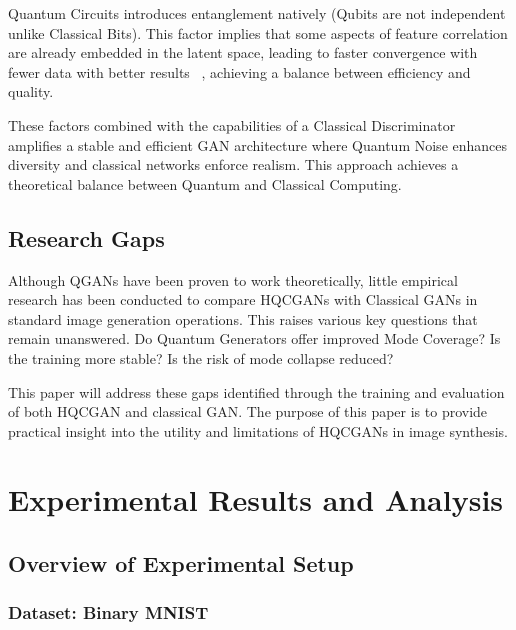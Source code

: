 \documentclass[conference]{IEEEtran}
\begin{document}
Quantum Circuits introduces entanglement natively (Qubits are not independent unlike Classical Bits). This factor implies that some aspects of feature correlation are already embedded in the latent space, leading to faster convergence with fewer data with better results ~\cite{b7}, achieving a balance between efficiency and quality.

These factors combined with the capabilities of a Classical Discriminator amplifies a stable and efficient GAN architecture where Quantum Noise enhances diversity and classical networks enforce realism. This approach achieves a theoretical balance between Quantum and Classical Computing.

\subsection{Research Gaps}

Although QGANs have been proven to work theoretically, little empirical research has been conducted to compare HQCGANs with Classical GANs in standard image generation operations. This raises various key questions that remain unanswered. Do Quantum Generators offer improved Mode Coverage? Is the training more stable? Is the risk of mode collapse reduced?

This paper will address these gaps identified through the training and evaluation of both HQCGAN and classical GAN. The purpose of this paper is to provide practical insight into the utility and limitations of HQCGANs in image synthesis.

\section{Experimental Results and Analysis}\label{Experimental Results and Analysis}

\subsection{Overview of Experimental Setup}

\subsubsection{Dataset: Binary MNIST}
\end{document}
